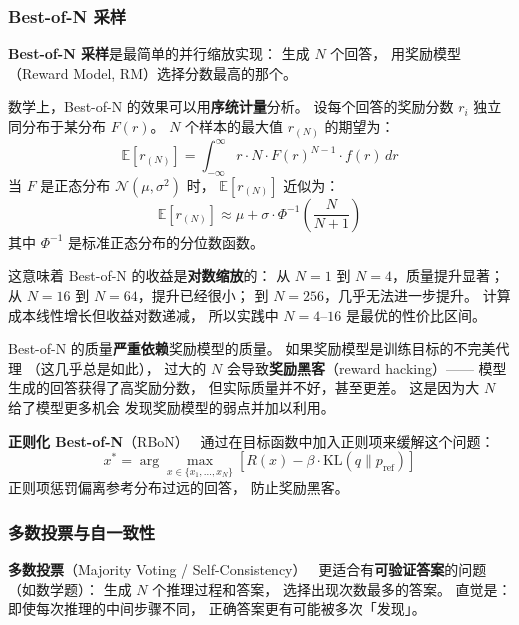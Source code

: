 \subsubsection{Best-of-N 采样}

\textbf{Best-of-N 采样}是最简单的并行缩放实现：
生成 $N$ 个回答，
用奖励模型（Reward Model, RM）选择分数最高的那个。

数学上，Best-of-N 的效果可以用\textbf{序统计量}分析。
设每个回答的奖励分数 $r_i$ 独立同分布于某分布 $F(r)$。
$N$ 个样本的最大值 $r_{(N)}$ 的期望为：
\begin{equation}
  \mathbb{E}[r_{(N)}] = \int_{-\infty}^{\infty} r \cdot N \cdot F(r)^{N-1} \cdot f(r)\, dr
\end{equation}
当 $F$ 是正态分布 $\mathcal{N}(\mu, \sigma^2)$ 时，
$\mathbb{E}[r_{(N)}]$ 近似为：
\begin{equation}
  \mathbb{E}[r_{(N)}] \approx \mu + \sigma \cdot \Phi^{-1}\!\left(\frac{N}{N+1}\right)
\end{equation}
其中 $\Phi^{-1}$ 是标准正态分布的分位数函数。

这意味着 Best-of-N 的收益是\textbf{对数缩放}的：
从 $N=1$ 到 $N=4$，质量提升显著；
从 $N=16$ 到 $N=64$，提升已经很小；
到 $N=256$，几乎无法进一步提升。
计算成本线性增长但收益对数递减，
所以实践中 $N = 4$--$16$ 是最优的性价比区间。

\begin{warnbox}
Best-of-N 的质量\textbf{严重依赖}奖励模型的质量。
如果奖励模型是训练目标的不完美代理
（这几乎总是如此），
过大的 $N$ 会导致\textbf{奖励黑客}（reward hacking）——
模型生成的回答获得了高奖励分数，
但实际质量并不好，甚至更差。
这是因为大 $N$ 给了模型更多机会
发现奖励模型的弱点并加以利用。

\textbf{正则化 Best-of-N}（RBoN）~\cite{ichihara2025rbon}
通过在目标函数中加入正则项来缓解这个问题：
\begin{equation}
  x^* = \arg\max_{x \in \{x_1, \ldots, x_N\}} \left[ R(x) - \beta \cdot \mathrm{KL}(q \| p_{\text{ref}}) \right]
\end{equation}
正则项惩罚偏离参考分布过远的回答，
防止奖励黑客。
\end{warnbox}

\subsubsection{多数投票与自一致性}

\textbf{多数投票}（Majority Voting / Self-Consistency）~\cite{wang2023selfconsistency}
更适合有\textbf{可验证答案}的问题（如数学题）：
生成 $N$ 个推理过程和答案，
选择出现次数最多的答案。
直觉是：即使每次推理的中间步骤不同，
正确答案更有可能被多次「发现」。

